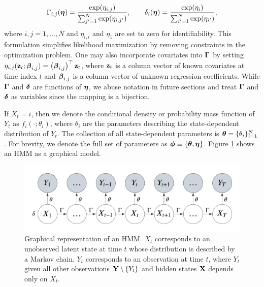 %
\begin{equation}
    \Gamma_{i,j}(\boldsymbol{\eta}) = \frac{\exp(\eta_{i,j})}{\sum_{j'=1}^N \exp(\eta_{i,j'})}, \qquad \delta_{i}(\boldsymbol{\eta}) = \frac{\exp(\eta_{i})}{\sum_{i'=1}^N \exp(\eta_{i'})},
    \label{eqn:reparam}
\end{equation}
%
where $i,j = 1,\ldots,N$ and $\eta_{i,i}$ and $\eta_{1}$ are set to zero for identifiability. This formulation simplifies likelihood maximization by removing constraints in the optimization problem. One may also incorporate covariates into $\boldsymbol{\Gamma}$ by setting $\eta_{i,j}(\mathbf{z}_t ; \boldsymbol{\beta}_{i,j}) = \left(\boldsymbol{\beta}_{i,j}\right)^{\top} \mathbf{z}_t$, where $\mathbf{z}_t$ is a column vector of known covariates at time index $t$ and $\boldsymbol{\beta}_{i,j}$ is a column vector of unknown regression coefficients. While $\boldsymbol{\Gamma}$ and $\boldsymbol{\delta}$ are functions of $\boldsymbol{\eta}$, we abuse notation in future sections and treat $\boldsymbol{\Gamma}$ and $\boldsymbol{\delta}$ as variables since the mapping is a bijection.

If $X_t=i$, then we denote the conditional density or probability mass function of $Y_t$ as $f_{i}(\cdot ; \theta_{i})$, where $\theta_{i}$ are the parameters describing the state-dependent distribution of $Y_t$. The collection of all state-dependent parameters is $\boldsymbol{\theta} = \{\theta_{i}\}_{i=1}^N$. For brevity, we denote the full set of parameters as $\boldsymbol{\phi} \equiv \{\boldsymbol{\theta},\boldsymbol{\eta}\}$. Figure \ref{fig:HMM} shows an HMM as a graphical model.
%
\begin{figure}[h]
    \centering
    \includegraphics[width=5in]{../plt/HMM.png}
    \caption{Graphical representation of an HMM. $X_t$ corresponds to an unobserved latent state at time $t$ whose distribution is described by a Markov chain. $Y_t$ corresponds to an observation at time $t$, where $Y_t$ given all other observations $\mathbf{Y} \setminus \{Y_t\}$ and hidden states $\mathbf{X}$ depends only on $X_t$.}
    \label{fig:HMM}
\end{figure}
%

